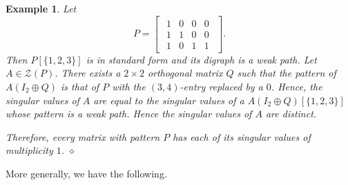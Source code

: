 \documentclass[preprint,12pt]{elsarticle}
\newtheorem{Example}[theorem]{Example}
\begin{document}
\begin{Example}
\label{aster}
\rm 
Let 
\[ P = 
\begin{bmatrix}
\begin{array}{cccc}
1 & 0 & 0 & 0\\
1 & 1 & 0 & 0 \\
1 & 0 & 1 & 1 
\end{array} 
\end{bmatrix}.
\]
Then $P[\{1,2,3\}]$ is in standard form and its digraph is a weak path. Let $A \in \mathcal{Z}(P)$. 
There exists a $2\times 2$ orthogonal matrix 
$Q$ such that the pattern of 
$A(I_2 \oplus Q)$ is that of $P$ with the $(3,4)$-entry replaced by a  $0$.  Hence, the 
singular values of $A$ are equal to the singular values of a $A(I_2 \oplus Q)[\{1,2,3\}]$ whose pattern is a weak path.  Hence the singular values of $A$ are distinct. 

Therefore, every matrix with pattern $P$ 
has each of its singular values of multiplicity $1$. 
 $\diamond$  \end{Example}

More generally, we have the following. 
\end{document}
